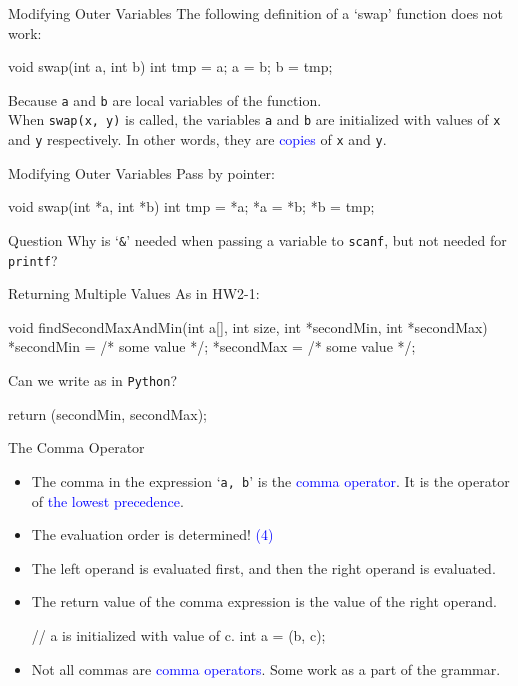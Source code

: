 \documentclass{beamer}
\newcommand{\blue}[1]{\textcolor{blue}{#1}}
\newcommand{\ttt}[1]{\texttt{#1}}
\newenvironment{question}{\begin{alertblock}{Question}}{\end{alertblock}}
\begin{document}
\begin{frame}[fragile]{Modifying Outer Variables}
	The following definition of a `swap' function does not work:
	\begin{cpp}
void swap(int a, int b) {
  int tmp = a;
  a = b;
  b = tmp;
}
	\end{cpp}
	\pause
	Because \ttt{a} and \ttt{b} are local variables of the function.\\
	When \ttt{swap(x, y)} is called, the variables \ttt{a} and \ttt{b} are initialized with values of \ttt{x} and \ttt{y} respectively. In other words, they are \blue{copies} of \ttt{x} and \ttt{y}.
\end{frame}

\begin{frame}[fragile]{Modifying Outer Variables}
	Pass by pointer:
	\begin{cpp}
void swap(int *a, int *b) {
  int tmp = *a;
  *a = *b;
  *b = tmp;
}
	\end{cpp}
	\pause
	\begin{question}
		Why is `\ttt{\&}' needed when passing a variable to \ttt{scanf}, but not needed for \ttt{printf}?
	\end{question}
\end{frame}

\begin{frame}[fragile]{Returning Multiple Values}
	As in HW2-1:
	\begin{cpp}
void findSecondMaxAndMin(int a[], int size, int *secondMin, int *secondMax) {
  *secondMin = /* some value */;
  *secondMax = /* some value */;
}
	\end{cpp}
	\pause
	Can we write as in \ttt{Python}?
	\begin{cpp}
return (secondMin, secondMax);
	\end{cpp}
\end{frame}

\begin{frame}[fragile]{The Comma Operator}
	\begin{itemize}
		\item The comma in the expression `\ttt{a, b}' is the \blue{comma operator}. It is the operator of \blue{the lowest precedence}.
		\pause
		\item The evaluation order is determined! \blue{(4)}
		\item The left operand is evaluated first, and then the right operand is evaluated.
		\item The return value of the comma expression is the value of the right operand.
		\begin{cpp}
// a is initialized with value of c.
int a = (b, c);
		\end{cpp}
		\pause
		\item Not all commas are \blue{comma operators}. Some work as a part of the grammar.
	\end{itemize}
\end{frame}
\end{document}
